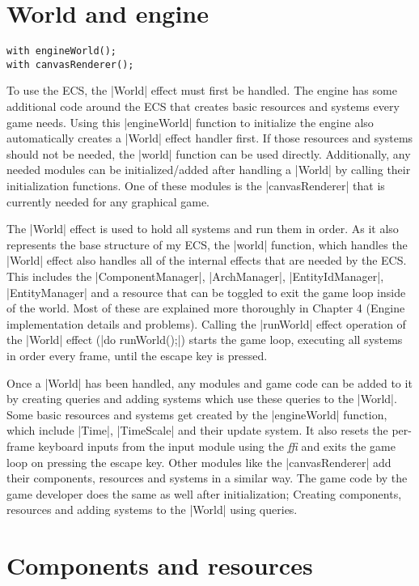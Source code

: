 \section{World and engine}

\begin{lstlisting}[caption=Engine initialization]
with engineWorld();
with canvasRenderer();
\end{lstlisting}

To use the ECS, the |World| effect must first be handled. The engine has some additional code around the ECS that creates basic resources and systems every game needs. Using this |engineWorld| function to initialize the engine also automatically creates a |World| effect handler first. If those resources and systems should not be needed, the |world| function can be used directly. Additionally, any needed modules can be initialized/added after handling a |World| by calling their initialization functions. One of these modules is the |canvasRenderer| that is currently needed for any graphical game.

The |World| effect is used to hold all systems and run them in order. As it also represents the base structure of my ECS, the |world| function, which handles the |World| effect also handles all of the internal effects that are needed by the ECS. This includes the |ComponentManager|, |ArchManager|, |EntityIdManager|, |EntityManager| and a resource that can be toggled to exit the game loop inside of the world. Most of these are explained more thoroughly in Chapter 4 (Engine implementation details and problems). Calling the |runWorld| effect operation of the |World| effect (|do runWorld();|) starts the game loop, executing all systems in order every frame, until the escape key is pressed.

Once a |World| has been handled, any modules and game code can be added to it by creating queries and adding systems which use these queries to the |World|. Some basic resources and systems get created by the |engineWorld| function, which include |Time|, |TimeScale| and their update system. It also resets the per-frame keyboard inputs from the input module using the \textit{ffi} and exits the game loop on pressing the escape key. Other modules like the |canvasRenderer| add their components, resources and systems in a similar way. The game code by the game developer does the same as well after initialization; Creating components, resources and adding systems to the |World| using queries.

\section{Components and resources}

